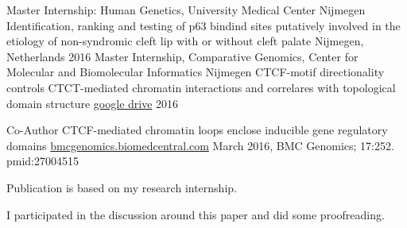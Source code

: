 

\begin{cventries}

  \cventry
    {Master Internship: Human Genetics, University Medical Center Nijmegen} %
    {Identification, ranking and testing of p63 bindind sites putatively involved in the etiology of non-syndromic cleft lip with or without cleft palate} %
    {Nijmegen, Netherlands} %
    {2016} %
    {}
  \cventry
    {Master Internship, Comparative Genomics,  Center for Molecular and Biomolecular Informatics Nijmegen} %
    {CTCF-motif directionality controls CTCT-mediated chromatin interactions and correlares with topological domain structure} %
    {\href{https://drive.google.com/file/d/1fE28UxBNoNXvjtaJWrduGhyCLluwIuqX/view?usp=sharing}{google drive}} %
    {2016} %
    {}

  \cventry
    {Co-Author}
    {CTCF-mediated chromatin loops enclose inducible gene regulatory domains} %
    {\href{https://www.ncbi.nlm.nih.gov/pmc/articles/PMC4804521/pdf/12864_2016_Article_2516.pdf}{bmcgenomics.biomedcentral.com}}
    {March 2016, BMC Genomics; 17:252. pmid:27004515} %
    {
      \begin{cvitems}
        \item {Publication is based on my research internship.}
        \item {I participated in the discussion around this paper and did some proofreading.}
      \end{cvitems}
    }
\end{cventries}
